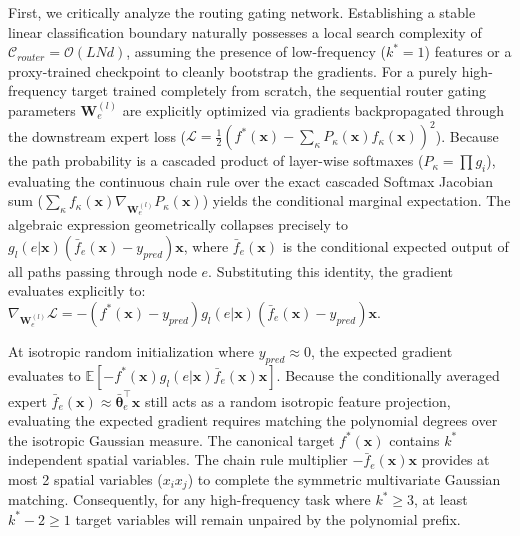 \documentclass{article}
\newcommand{\1}{\mathbb{I}}
\newcommand{\calO}{\mathcal{O}}
\newcommand{\bx}{\mathbf{x}}
\begin{document}
First, we critically analyze the routing gating network. Establishing a stable linear classification boundary naturally possesses a local search complexity of $\mathcal{C}_{router} = \calO(L N d)$, assuming the presence of low-frequency ($k^*=1$) features or a proxy-trained checkpoint to cleanly bootstrap the gradients. For a purely high-frequency target trained completely from scratch, the sequential router gating parameters $\mathbf{W}_e^{(l)}$ are explicitly optimized via gradients backpropagated through the downstream expert loss ($\mathcal{L} = \frac{1}{2}(f^*(\mathbf{x}) - \sum_\kappa P_\kappa(\mathbf{x}) f_\kappa(\mathbf{x}))^2$). Because the path probability is a cascaded product of layer-wise softmaxes ($P_\kappa = \prod g_i$), evaluating the continuous chain rule over the exact cascaded Softmax Jacobian sum ($\sum_{\kappa} f_{\kappa}(\mathbf{x}) \nabla_{\mathbf{W}_e^{(l)}} P_\kappa(\mathbf{x})$) yields the conditional marginal expectation. The algebraic expression geometrically collapses precisely to $g_l(e|\mathbf{x}) (\bar{f}_e(\mathbf{x}) - y_{pred}) \mathbf{x}$, where $\bar{f}_e(\mathbf{x})$ is the conditional expected output of all paths passing through node $e$. Substituting this identity, the gradient evaluates explicitly to: $\nabla_{\mathbf{W}_e^{(l)}} \mathcal{L} = -(f^*(\mathbf{x}) - y_{pred}) g_l(e|\mathbf{x}) (\bar{f}_e(\mathbf{x}) - y_{pred}) \mathbf{x}$.
 

At isotropic random initialization where $y_{pred} \approx 0$, the expected gradient evaluates to $\mathbb{E}[-f^*(\mathbf{x}) g_l(e|\mathbf{x})\bar{f}_e(\mathbf{x}) \mathbf{x}]$. Because the conditionally averaged expert $\bar{f}_e(\mathbf{x}) \approx \bar{\boldsymbol{\theta}}_e^\top \mathbf{x}$ still acts as a random isotropic feature projection, evaluating the expected gradient requires matching the polynomial degrees over the isotropic Gaussian measure. The canonical target $f^*(\bx)$ contains $k^*$ independent spatial variables. The chain rule multiplier $-\bar{f}_e(\mathbf{x})\mathbf{x}$ provides at most 2 spatial variables ($x_i x_j$) to complete the symmetric multivariate Gaussian matching. Consequently, for any high-frequency task where $k^* \ge 3$, at least $k^*-2 \ge 1$ target variables will remain unpaired by the polynomial prefix. 
\end{document}
